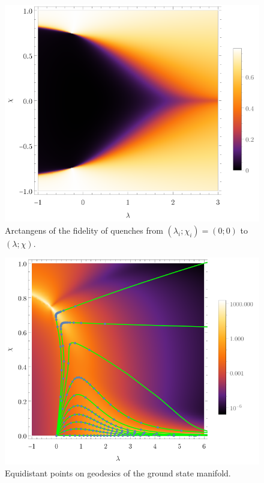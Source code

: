 \begin{figure}[H]
    \centering
    \includegraphics[scale=1.2]{../img/quenchFidelityFrom00.pdf}
    \caption{Arctangens of the fidelity of quenches from $(\lambda_i;\chi_i)=(0;0)$ to $(\lambda;\chi)$.}
    \label{fig:quenchFidelityFrom00}    
\end{figure}

\begin{figure}[H]
    \centering
    \includegraphics[scale=1.2]{../img/equidistantPointsOnPath.pdf}
    \caption{Equidistant points on geodesics of the ground state manifold.}
    \label{fig:equidistantPointsOnPath}    
\end{figure}

